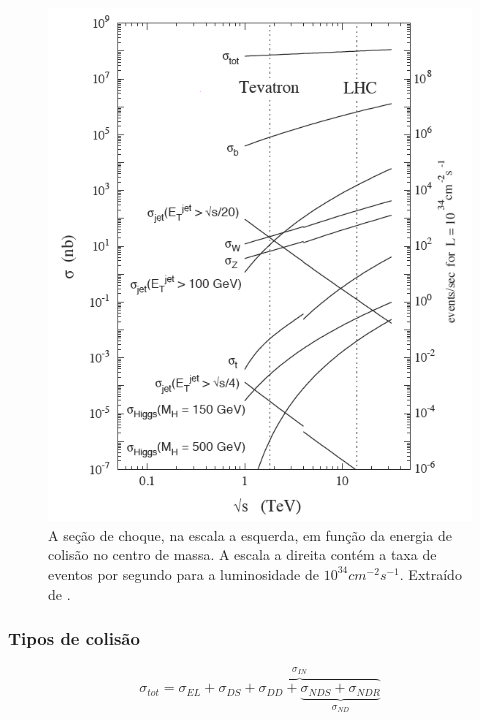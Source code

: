 \begin{figure}[h!t]
\centering
\includegraphics[width=.7\textwidth]{imagens/Lum_cross.png}
\caption[A seção de choque em função da energia de colisão no centro de massa]{
A seção de choque, na escala a esquerda, em função da energia de colisão no
centro de massa. A escala a direita contém a taxa de eventos por segundo 
para a luminosidade de $10^{34}cm^{-2}s^{-1}$. 
Extraído de \cite{ATLAS_HLT_DAQ}.}
\label{fig:lum_cross}
\end{figure}


\subsubsection{Tipos de colisão}
\label{sssec:tipos_col}

\begin{equation}
\sigma_{tot} =  \sigma_{EL} + \overbrace{\sigma_{DS} + \sigma_{DD} +
\underbrace{\sigma_{NDS}+\sigma_{NDR}}_{\sigma_{ND}}}^{\sigma_{IN}}
\label{eq:secao_choque}
\end{equation}

